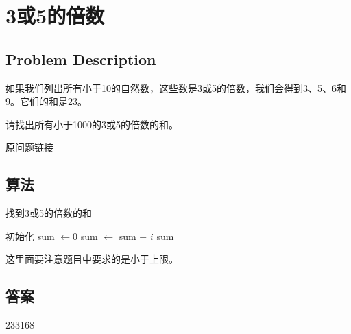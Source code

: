 \section{3或5的倍数}
\subsection{Problem Description}
\begin{tcolorbox}
	如果我们列出所有小于10的自然数，这些数是3或5的倍数，我们会得到3、5、6和9。它们的和是23。

	请找出所有小于1000的3或5的倍数的和。

	\href{https://projecteuler.net/problem=1}{原问题链接}
\end{tcolorbox}

\subsection{算法}
\begin{algorithm}
	\caption{找到3或5的倍数的和}
	\begin{algorithmic}
		\State 初始化 sum $\gets 0$
		\State sum $\gets$ sum + $i$
		\EndIf
		\EndFor
		\Return sum
	\end{algorithmic}
\end{algorithm}
这里面要注意题目中要求的是小于上限。

\subsection{答案}
233168
